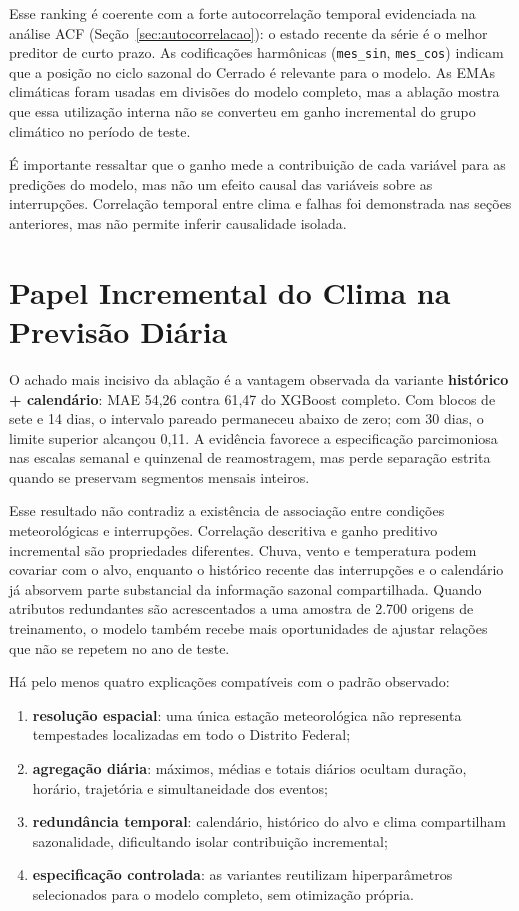 Esse ranking é coerente com a forte autocorrelação temporal evidenciada na análise ACF (Seção~\ref{sec:autocorrelacao}): o estado recente da série é o melhor preditor de curto prazo. As codificações harmônicas (\texttt{mes\_sin}, \texttt{mes\_cos}) indicam que a posição no ciclo sazonal do Cerrado é relevante para o modelo. As EMAs climáticas foram usadas em divisões do modelo completo, mas a ablação mostra que essa utilização interna não se converteu em ganho incremental do grupo climático no período de teste.

É importante ressaltar que o ganho mede a contribuição de cada variável para as predições do modelo, mas não um efeito causal das variáveis sobre as interrupções. Correlação temporal entre clima e falhas foi demonstrada nas seções anteriores, mas não permite inferir causalidade isolada.

\section{Papel Incremental do Clima na Previsão Diária}\label{sec:discussao_ablacao}

O achado mais incisivo da ablação é a vantagem observada da variante \textbf{histórico + calendário}: MAE 54,26 contra 61,47 do XGBoost completo. Com blocos de sete e 14 dias, o intervalo pareado permaneceu abaixo de zero; com 30 dias, o limite superior alcançou 0,11. A evidência favorece a especificação parcimoniosa nas escalas semanal e quinzenal de reamostragem, mas perde separação estrita quando se preservam segmentos mensais inteiros.

Esse resultado não contradiz a existência de associação entre condições meteorológicas e interrupções. Correlação descritiva e ganho preditivo incremental são propriedades diferentes. Chuva, vento e temperatura podem covariar com o alvo, enquanto o histórico recente das interrupções e o calendário já absorvem parte substancial da informação sazonal compartilhada. Quando atributos redundantes são acrescentados a uma amostra de 2.700 origens de treinamento, o modelo também recebe mais oportunidades de ajustar relações que não se repetem no ano de teste.

Há pelo menos quatro explicações compatíveis com o padrão observado:
\begin{enumerate}
    \item \textbf{resolução espacial}: uma única estação meteorológica não representa tempestades localizadas em todo o Distrito Federal;
    \item \textbf{agregação diária}: máximos, médias e totais diários ocultam duração, horário, trajetória e simultaneidade dos eventos;
    \item \textbf{redundância temporal}: calendário, histórico do alvo e clima compartilham sazonalidade, dificultando isolar contribuição incremental;
    \item \textbf{especificação controlada}: as variantes reutilizam hiperparâmetros selecionados para o modelo completo, sem otimização própria.
\end{enumerate}

